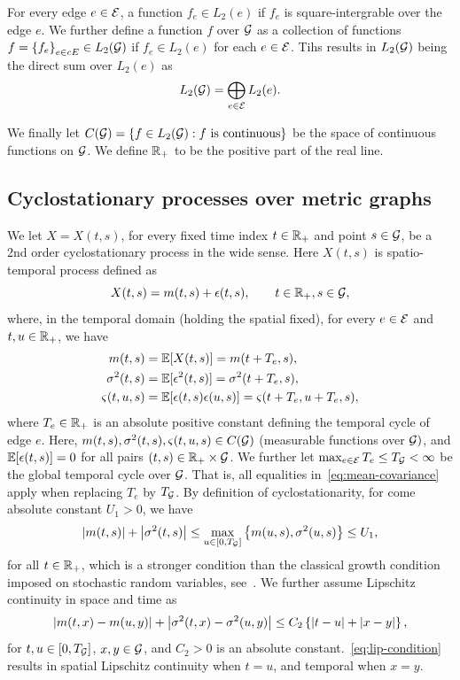 \documentclass[12pt]{article}
\begin{document}
{{For every edge $e\in \mathcal{E}$, a function $f_e \in L_2(e)$ if $f_e$ is square-intergrable over the edge $e$. We further define a function $f$ over $\mathcal{G}$ as a collection of functions $f = \left\{f_e\right\}_{e \in cE} \in L_2(\mathcal{G})$ if $f_e \in L_2(e)$ for each $e \in \mathcal{E}$. Tihs results in $L_2(\mathcal{G})$ being the direct sum over $L_2(e)$ as 
\[L_2(\mathcal{G}) = \bigoplus_{e \in \mathcal{E}} L_2(e). \]

We finally let $C(\mathcal{G}) = \left\{f \in L_2(\mathcal{G}): f \text{ is continuous}\right\}$ be the space of continuous functions on $\mathcal{G}$. We define $\mathbb{R}_+$ to be the positive part of the real line.

\subsection{Cyclostationary processes over metric graphs}\label{sec:cyclostationary}
We let $X=X(t, s)$, for every fixed time index $t \in \mathbb{R}_+$ and point $s \in \mathcal{G}$, be a 2nd order cyclostationary process in the wide sense. Here $X(t,s)$ is spatio-temporal process defined as
\begin{equation} \label{eq:speed}
X(t,s) = m(t, s) + \epsilon(t, s), \qquad t \in \mathbb{R}_+, s \in \mathcal{G},
\end{equation}
where, in the temporal domain (holding the spatial fixed), for every $e \in \mathcal{E}$ and $t, u \in \mathbb{R}_+$, we have
\begin{subequations}
\label{eq:mean-covariance}
\begin{align}
    m(t, s) & =\mathbb{E}[X(t,s)] = m(t + T_e, s), \label{eq:mean}\\
    \sigma^2(t, s) &= \mathbb{E}[\epsilon^2(t,s)] = \sigma^2(t +T_e, s), \label{eq:variance}\\
    \varsigma(t, u, s) &= \mathbb{E}[\epsilon(t,s)\epsilon(u, s)] = \varsigma(t +T_e, u+T_e, s) \label{eq:covariance},
\end{align}
\end{subequations}
where $T_e \in \mathbb{R}_+$ is an absolute positive constant defining the temporal cycle of edge $e$. Here, $m(t,s), \sigma^2(t,s), \varsigma(t,u, s) \in C(\mathcal{G})$ (measurable functions over $\mathcal{G})$, and $\mathbb{E}[\epsilon(t,s)]=0$ for all pairs $(t, s) \in \mathbb{R}_+ \times \mathcal{G}$.  We further let $\max_{e\in \mathcal{E}} T_e \leq T_{\mathcal{G}} < \infty$ be the global temporal cycle over $\mathcal{G}$. That is, all equalities in~\eqref{eq:mean-covariance} apply when replacing $T_e$ by $T_{\mathcal{G}}$. By definition of cyclostationarity, for come absolute constant $U_1>0$, we have
\[\left|m(t,s)\right| + \left|\sigma^2(t,s)\right| \leq \max_{u \in [0, T_{\mathcal{G}}]}\left\{m(u, s), \sigma^2(u, s)\right\} \leq U_1,\]
for all $t\in \mathbb{R}_+$, which is a stronger condition than the classical growth condition imposed on stochastic random variables, see~\citet[Thm.~5.2.1]{oksendal2013stochastic}. We further assume Lipschitz continuity in space and time as 
\begin{equation}\label{eq:lip-condition}
    \left|m(t,x) - m(u, y)\right| + \left|\sigma^2(t,x) - \sigma^2(u,y)\right| \leq C_2 \left\{\left|t-u\right| + \left|x-y\right|\right\},
\end{equation}
for $t, u \in \left[0, T_{\mathcal{G}}\right]$, $x,y \in \mathcal{G}$, and $C_2>0$ is an absolute constant.~\eqref{eq:lip-condition} results in spatial Lipschitz continuity when $t=u$, and temporal when $x=y$. 

}}
\end{document}
